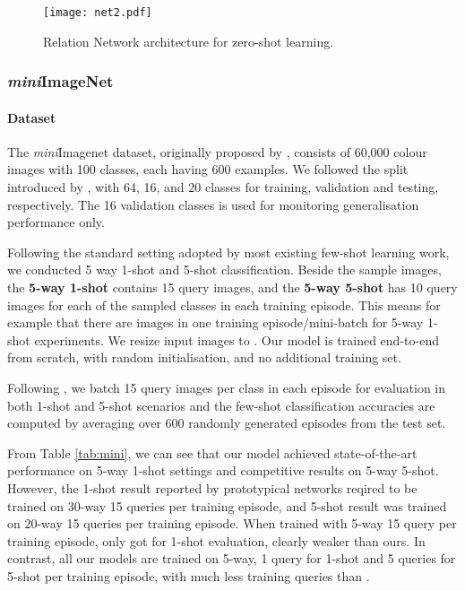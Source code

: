 \documentclass[10pt,twocolumn,letterpaper]{article}
\begin{document}
\begin{figure}[t]
\begin{center}
\texttt{[image: net2.pdf]}
\end{center}
   \caption{\small Relation Network architecture for zero-shot learning.}
\label{fig:networks2}
\vspace{-1em}
\end{figure}


\subsubsection{\textit{mini}ImageNet} 
\paragraph{Dataset}
The \textit{mini}Imagenet dataset, originally proposed by \cite{vinyals2016matching}, consists of 60,000 colour images with 100 classes, each having 600 examples. 
We followed the split introduced by \cite{ravi2016optimization}, with 64, 16, and 20 classes for training, validation and testing, respectively. The 16 validation classes is used for monitoring generalisation performance only.




Following the standard setting adopted by most existing few-shot learning work, we conducted 5 way 1-shot and 5-shot classification. 
Beside the  sample images, the \textbf{5-way 1-shot} contains 15 query images, and the \textbf{5-way 5-shot} has 10 query images for each of the  sampled classes in each training episode.
This means for example that there are  images in one training episode/mini-batch for 5-way 1-shot experiments. We resize  input images to . Our model is trained end-to-end from scratch, with random initialisation, and no additional training set. 




Following \cite{snell2017prototypical}, we batch 15 query images per class in each episode for evaluation in both 1-shot and 5-shot scenarios and the few-shot classification accuracies are computed by averaging over 600 randomly generated episodes from the test set.

From Table \ref{tab:mini}, we can see that our model achieved state-of-the-art performance on 5-way 1-shot settings and competitive results on 5-way 5-shot.
However, the 1-shot result reported by prototypical networks \cite{snell2017prototypical} reqired to be trained on 30-way 15 queries per training episode, and 5-shot result was trained on 20-way 15 queries per training episode.
When trained with 5-way 15 query per training episode, \cite{snell2017prototypical} only got  for 1-shot evaluation,
clearly weaker than ours.
In contrast, all our models are trained on 5-way, 1 query for 1-shot and 5 queries for 5-shot per training episode, with much less training queries than \cite{snell2017prototypical}. 
\end{document}
